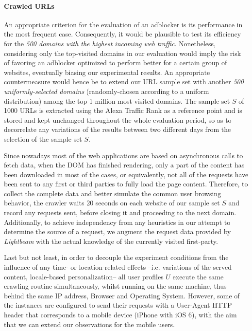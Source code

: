 \documentclass{sig-alternate}
\begin{document}
\paragraph{Crawled URLs}
\label{sec:crawled_urls}
An appropriate criterion for the evaluation of an adblocker is its performance in the most frequent case. Consequently, it would be plausible to test its efficiency for the \textit{500 domains with the highest incoming web traffic}. Nonetheless, considering only the top-visited domains in our evaluation would imply the risk of favoring an adblocker optimized to perform better for a certain group of websites, eventually biasing our experimental results. An appropriate countermeasure would hence be to extend our URL sample set with another \textit{500 uniformly-selected domains} (randomly-chosen according to a uniform distribution) among the top 1 million most-visited domains. The sample set $S$ of 1000 URLs is extracted using the Alexa Traffic Rank as a reference point and is stored and kept unchanged throughout the whole evaluation period, so as to decorrelate any variations of the results between two different days from the selection of the sample set $S$.

Since nowadays most of the web applications are based on asynchronous calls to fetch data, when the DOM has finished rendering, only a part of the content has been downloaded in most of the cases, or equivalently, not all of the requests have been sent to any first or third parties to fully load the page content. Therefore, to collect the complete data and better simulate the common user browsing behavior, the crawler waits 20 seconds on each website of our sample set $S$ and record any requests sent, before closing it and proceeding to the next domain. Additionally, to achieve independency from any heuristics in our attempt to determine the source of a request, we augment the request data provided by \textit{Lightbeam} with the actual knowledge of the currently visited first-party.

Last but not least, in order to decouple the experiment conditions from the influence of any time- or location-related effects --i.e. variations of the served content, locale-based personalization-- all user profiles $U$ execute the same crawling routine simultaneously, whilst running on the same machine, thus behind the same IP address, Browser and Operating System. However, some of the instances are configured to send their requests with a User-Agent HTTP header that corresponds to a mobile device (iPhone with iOS 6), with the aim that we can extend our observations for the mobile users.
\end{document}
